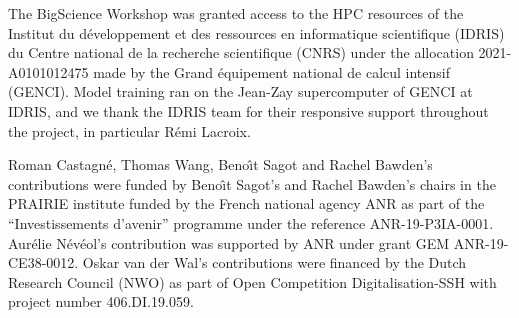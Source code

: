 \documentclass[twoside,11pt]{article}
\begin{document}
\begin{acks}
The BigScience Workshop was granted access to the HPC resources of the Institut du développement et des ressources en informatique scientifique (IDRIS) du Centre national de la recherche scientifique (CNRS) under the allocation 2021-A0101012475 made by the Grand équipement national de calcul intensif (GENCI). Model training ran on the Jean-Zay supercomputer of GENCI at IDRIS, and we thank the IDRIS team for their responsive support throughout the project, in particular Rémi Lacroix.

Roman Castagné, Thomas Wang, Beno\^\i t Sagot and Rachel Bawden's contributions were funded by Beno\^\i t Sagot's and Rachel Bawden's chairs in the PRAIRIE institute funded by the French national agency ANR as part of the ``Investissements d’avenir'' programme under the reference ANR-19-P3IA-0001.
Aur\'elie N\'ev\'eol's contribution was supported by ANR under grant GEM
ANR-19-CE38-0012. 
Oskar van der Wal's contributions were financed by the Dutch Research Council (NWO) as part of Open Competition Digitalisation-SSH with project number 406.DI.19.059.


\end{acks}
\end{document}
